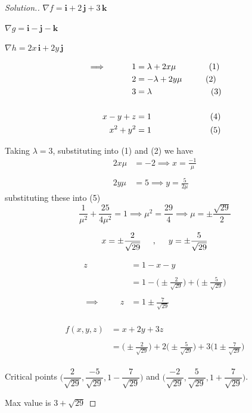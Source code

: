 \documentclass[11pt,a4paper]{article}
\theoremstyle{definition}
\newenvironment{solution}
  {\renewcommand{\qedsymbol}{}\begin{proof}[\textit{Solution}.]}
  {\end{proof}}
\begin{document}
\begin{solution}


$\nabla f = \textbf{i} + 2\,\textbf{j} + 3\,\textbf{k}$


$\nabla g = \textbf{i} - \textbf{j} - \textbf{k}$


$\nabla h = 2x\,\textbf{i} + 2y\,\textbf{j}$

\begin{align*}
\implies \hspace{1cm} 1 & = \lambda + 2x\mu \hspace{1.4cm} (1)\\
                      2 & = -\lambda + 2y\mu \hspace{1cm} (2)\\
                      3 & = \lambda \hspace{2.5cm} (3)\\\\
         x - y + z & = 1 \hspace{2.5cm} (4)\\
         x^2 + y^2 & = 1\hspace{2.5cm} (5)\\
\end{align*}

Taking $\lambda = 3$, substituting into (1) and (2) we have
\begin{align*}
2x\mu & = -2 \implies x = \frac{-1}{\mu}\\\\
2y\mu & = 5 \implies y = \frac{5}{2\mu}
\end{align*}
substituting these into (5)
$$\frac{1}{\mu^2}+ \frac{25}{4\mu^2} = 1 \implies \mu^2 = \frac{29}{4}\implies \mu = \pm\frac{\sqrt{29}}{2}$$


$$x = \pm \frac{2}{\sqrt{29}}\hspace{0.5cm},\hspace{0.5cm} y = \pm \frac{5}{\sqrt{29}}$$


\begin{align*}
z & = 1 -x - y\\\\
 & = 1 - \bigg(\pm\frac{2}{\sqrt{29}}\bigg) + \bigg(\pm \frac{5}{\sqrt{29}}\bigg)\\\\
\implies \hspace{1cm} z & = 1 \pm \frac{7}{\sqrt{29}}\\
\end{align*}

\begin{align*}
f(x,y,z) & = x + 2y + 3z\\\\
& = \bigg(\pm \frac{2}{\sqrt{29}}\bigg) + 2\bigg(\pm \frac{5}{\sqrt{29}}\bigg) + 3\bigg( 1 \pm \frac{7}{\sqrt{29}}\bigg)\\
\end{align*}

Critical points $\bigg(\dfrac{2}{\sqrt{29}}, \dfrac{-5}{\sqrt{29}}, 1 - \dfrac{7}{\sqrt{29}}\bigg)$ and $\bigg(\dfrac{-2}{\sqrt{29}}, \dfrac{5}{\sqrt{29}}, 1 + \dfrac{7}{\sqrt{29}}\bigg)$.


Max value is $3 + \sqrt{29}$
\end{solution}
\end{document}
